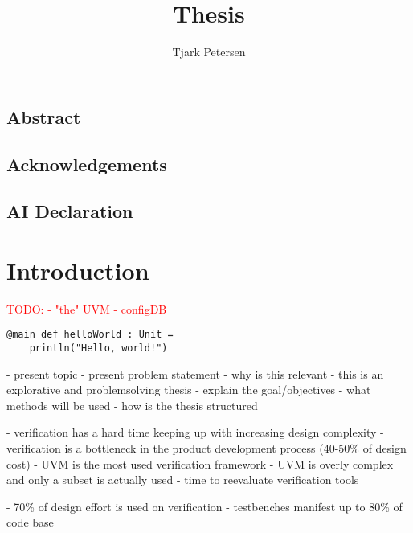\documentclass[11pt]{report}
\author{Tjark Petersen}
\title{Thesis}
\newcommand{\todo}[1]{\textcolor{red}{TODO: #1}}
\begin{document}
\maketitle

\section*{Abstract} %

\section*{Acknowledgements} %

\section*{AI Declaration} %

\newpage

\tableofcontents

\chapter{Introduction} %


\todo{
  - "the" UVM
  - configDB
}

\begin{lstlisting}
@main def helloWorld : Unit =
    println("Hello, world!")
\end{lstlisting}
- present topic
- present problem statement
- why is this relevant
- this is an explorative and problemsolving thesis
- explain the goal/objectives
- what methods will be used
- how is the thesis structured

- verification has a hard time keeping up with increasing design complexity
- verification is a bottleneck in the product development process (40-50\% of design cost) \cite{mehta2018asic}
- UVM is the most used verification framework
- UVM is overly complex and only a subset is actually used \cite{sutherland2015uvm}
- time to reevaluate verification tools

- 70\% of design effort is used on verification \cite[Ch. 1]{bergeron2012writing}
- testbenches manifest up to 80\% of code base \cite[Ch. 1]{bergeron2012writing}
\end{document}
